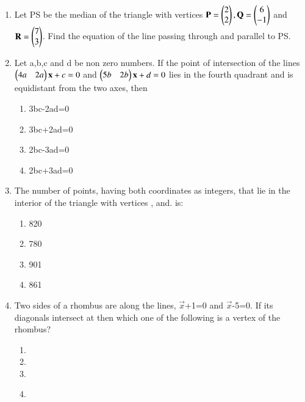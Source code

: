 \begin{enumerate}[label=\arabic*.,ref=\thesubsection.\theenumi]
    \item Let PS be the median of the triangle with vertices $\mathbf{P}= \begin{pmatrix}2\\2\end{pmatrix}, \mathbf{Q}=\begin{pmatrix}6\\-1\end{pmatrix} $ and $\mathbf{R}=  \begin{pmatrix}7\\3\end{pmatrix}$. Find the equation of the line passing through  and parallel to PS. 
    \item Let a,b,c and d be non zero numbers. If the point of  intersection of the lines $\begin{pmatrix}4a & 2a\end{pmatrix}\mathbf{x} + c = 0$ and $\begin{pmatrix}5b & 2b\end{pmatrix}\mathbf{x} + d = 0$ lies in the fourth quadrant and is equidistant from the two axes, then
    \begin{enumerate}
     \item  3bc-2ad=0
     \item  3bc+2ad=0
     \item  2bc-3ad=0
     \item  2bc+3ad=0\\
     \end{enumerate}
    \item The number of points, having both coordinates as integers, that lie in the interior of the triangle with vertices , and. 
is:
    \begin{enumerate}
     \item  820 
     \item  780
     \item  901
     \item  861\\
     \end{enumerate}
    \item Two sides of a rhombus are along the lines,  $\vec {x}$+1=0 and $\vec {x}$-5=0. If its diagonals intersect at  then which one of the following is a vertex of the rhombus?
    \begin{enumerate}
     \item  {}
     \item  {}
     \item  {}
     \item  {}\\

\end{enumerate}
\end{enumerate}

